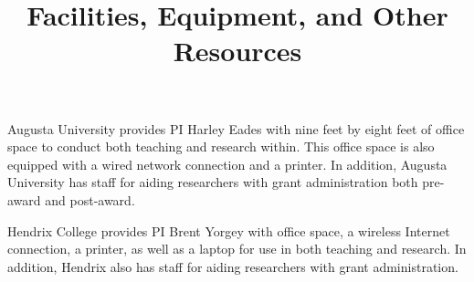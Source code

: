 \documentclass[11pt]{article}
\title{\vspace{-50px}Facilities, Equipment, and Other Resources}
\author{}
\date{\vspace{-60px}}
\begin{document}
\maketitle  

Augusta University provides PI Harley Eades with nine feet by eight
feet of office space to conduct both teaching and research within.
This office space is also equipped with a wired network connection and
a printer.  In addition, Augusta University has staff for aiding
researchers with grant administration both pre-award and post-award.

Hendrix College provides PI Brent Yorgey with office space, a wireless
Internet connection, a printer, as well as a laptop for use in both
teaching and research.  In addition, Hendrix also has staff for aiding
researchers with grant administration.


\end{document}
